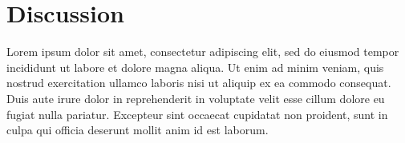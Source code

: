 \chapter{Discussion}\label{chap:discussion}

Lorem ipsum dolor sit amet, consectetur adipiscing elit, sed do eiusmod tempor incididunt ut labore et dolore magna aliqua. Ut enim ad minim veniam, quis nostrud exercitation ullamco laboris nisi ut aliquip ex ea commodo consequat. Duis aute irure dolor in reprehenderit in voluptate velit esse cillum dolore eu fugiat nulla pariatur. Excepteur sint occaecat cupidatat non proident, sunt in culpa qui officia deserunt mollit anim id est laborum.




